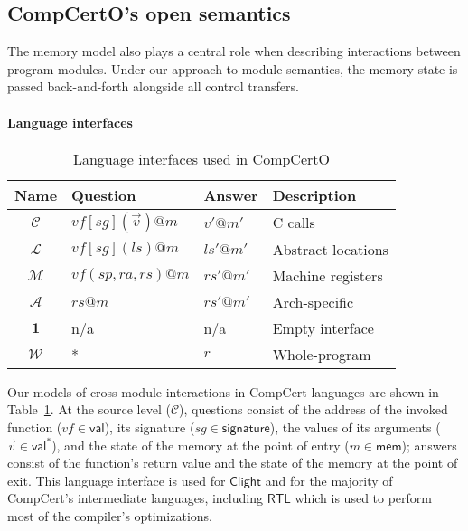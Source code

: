 \documentclass[acmsmall,authordraft]{acmart}
\newcommand{\kw}[1]{\ensuremath{ \mathsf{#1} }}
\begin{document}
\subsection{CompCertO's open semantics} \label{sec:sem:open} %

The memory model also plays a central role
when describing interactions between program modules.
Under our approach to module semantics,
the memory state is passed back-and-forth
alongside all control transfers.

\paragraph{Language interfaces} %

\begin{table} %
  \begin{tabular}{clll}
    \hline
    Name & Question & Answer & Description \\
    \hline
    $\mathcal{C}$ &
      $\mathit{vf}[\mathit{sg}](\vec{v})@m$ & $v'@m'$ &
      C calls \\
    $\mathcal{L}$ &
      $\mathit{vf}[\mathit{sg}](\mathit{ls})@m$ & $\mathit{ls}'@m'$ &
      Abstract locations \\
    $\mathcal{M}$ &
      $\mathit{vf}(\mathit{sp},\mathit{ra},\mathit{rs})@m$ & $\mathit{rs}'@m'$ &
      Machine registers \\
    $\mathcal{A}$ &
      $\mathit{rs}@m$ & $\mathit{rs}'@m'$ &
      Arch-specific \\
    $\mathbf{1}$ & n/a & n/a &
      Empty interface \\
    $\mathcal{W}$ & * & $r$ &
      Whole-program \\
    \hline
  \end{tabular}
  \caption{Language interfaces used in CompCertO}
  \label{tbl:li}
\end{table}

Our models of cross-module interactions in CompCert languages
are shown in Table~\ref{tbl:li}.
At the source level ($\mathcal{C}$),
questions consist of
the address of the invoked function
($\mathit{vf} \in \kw{val}$),
its signature
($\mathit{sg} \in \kw{signature}$),
the values of its arguments
($\vec{v} \in \kw{val}^*$),
and the state of the memory at the point of entry
($m \in \kw{mem}$);
answers
consist of the function's return value
and the state of the memory at the point of exit.
This language interface is used for \kw{Clight} and
for the majority of CompCert's intermediate languages,
including \kw{RTL} which is used to perform
most of the compiler's optimizations.
\end{document}
